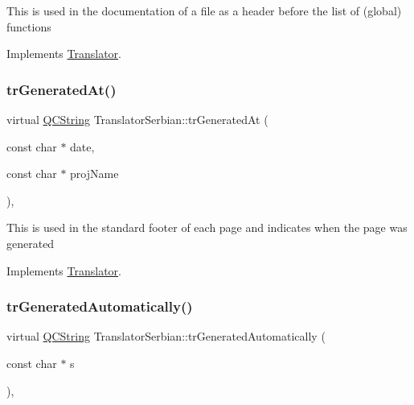 This is used in the documentation of a file as a header before the list of (global) functions 

Implements \mbox{\hyperlink{class_translator}{Translator}}.

\mbox{\label{class_translator_serbian_ada82dcd457ba18a45a3c779cf49f0d2c}} 
\subsubsection{\texorpdfstring{trGeneratedAt()}{trGeneratedAt()}}
{\footnotesize\ttfamily virtual \mbox{\hyperlink{class_q_c_string}{Q\+C\+String}} Translator\+Serbian\+::tr\+Generated\+At (\begin{DoxyParamCaption}\item[{const char $\ast$}]{date,  }\item[{const char $\ast$}]{proj\+Name }\end{DoxyParamCaption})\hspace{0.3cm}{\ttfamily [inline]}, {\ttfamily [virtual]}}

This is used in the standard footer of each page and indicates when the page was generated 

Implements \mbox{\hyperlink{class_translator}{Translator}}.

\mbox{\label{class_translator_serbian_a362621ce54dbcfacc1264ac6c15e63f2}} 
\subsubsection{\texorpdfstring{trGeneratedAutomatically()}{trGeneratedAutomatically()}}
{\footnotesize\ttfamily virtual \mbox{\hyperlink{class_q_c_string}{Q\+C\+String}} Translator\+Serbian\+::tr\+Generated\+Automatically (\begin{DoxyParamCaption}\item[{const char $\ast$}]{s }\end{DoxyParamCaption})\hspace{0.3cm}{\ttfamily [inline]}, {\ttfamily [virtual]}}

